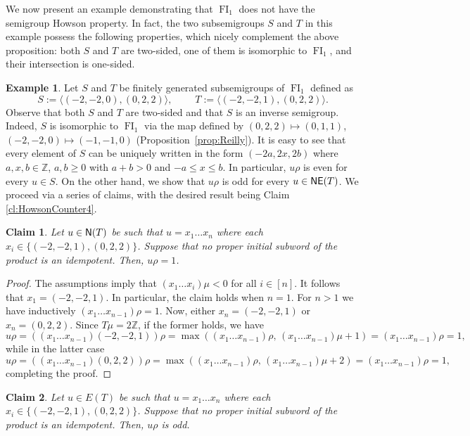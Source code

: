 \documentclass[reqno]{amsart}
\theoremstyle{plain}
\newtheorem{claim}{Claim}[lem]
\theoremstyle{definition}
\newtheorem{ex}[lem]{Example}
\DeclareMathOperator{\FI}{FI}
\DeclareMathOperator{\N}{\textup{\textsf{N}}}
\DeclareMathOperator{\NE}{\textup{\textsf{NE}}}
\numberwithin{equation}{section}
\begin{document}
We now present an example demonstrating that $\FI_1$ does not have the semigroup Howson property. 
In fact, the two subsemigroups $S$ and $T$ in this example possess the following properties, which nicely complement the above proposition: both $S$ and $T$ are two-sided, one  of them is isomorphic to $\FI_1$, and their intersection is one-sided.


\begin{ex}
\label{ex:HowsonCounter1}
Let $S$ and $T$ be finitely generated subsemigroups of $\FI_1$ defined as
\[
S := \bigl\langle (-2, -2, 0), (0, 2, 2)\bigr\rangle, \quad\quad\; T := \bigl\langle (-2, -2, 1), (0, 2, 2)\bigr\rangle.
\]
Observe that both $S$ and $T$ are two-sided and that $S$ is an inverse semigroup. Indeed, $S$ is isomorphic to $\FI_1$ via the map defined by $(0, 2, 2) \mapsto (0, 1, 1)$, $(-2, -2, 0)\mapsto (-1, -1, 0)$ (Proposition~\ref{prop:Reilly}). It is easy to see that every element of $S$ can be uniquely written in the form $(-2a, 2x, 2b)$ where $a, x, b\in\mathbb{Z}$, $a,b\geq 0$ with $a+b>0$ and $-a\leq x\leq b$. In particular, $u\rho$ is even for every $u\in S$. On the other hand, we show that $u\rho$ is odd for every $u\in\NE(T)$. We proceed via a series of claims, with the desired result being Claim \ref{cl:HowsonCounter4}.


\begin{claim}
\label{cl:HowsonCounter1}
Let $u\in \N(T)$ be such that $u = x_1\dots x_n$ where each $x_i\in\{(-2, -2, 1), (0, 2, 2)\}$. Suppose that no proper initial subword of the product is an idempotent. Then, $u\rho = 1$.
\end{claim}



\begin{proof}
The assumptions imply that $(x_1
\dots x_i)\mu<0$ for all $i\in [n]$.
It follows that $x_1 = (-2, -2, 1)$. In particular, the claim holds when $n=1$.
For $n>1$ we have inductively $(x_1\dots x_{n-1})\rho = 1$. Now, either $x_n = (-2, -2, 1)$ or $x_n = (0, 2, 2)$. Since $T\mu = 2\mathbb{Z}$, if the former holds, we have 
\[
u\rho = ((x_1\dots x_{n-1})(-2, -2, 1))\rho = \max((x_1\dots x_{n-1})\rho,\, (x_1\dots x_{n-1})\mu + 1) = (x_1\dots x_{n-1})\rho = 1,
\]
while in the latter case
\[
u\rho = ((x_1\dots x_{n-1})(0, 2, 2))\rho = \max((x_1\dots x_{n-1})\rho,\, (x_1\dots x_{n-1})\mu + 2) = (x_1\dots x_{n-1})\rho = 1,
\]
completing the  proof.
\end{proof}

\begin{claim}
\label{cl:HowsonCounter2}
Let $u\in E(T)$ be such that $u = x_1\dots x_n$ where each $x_i\in\{(-2, -2, 1), (0, 2, 2)\}$. Suppose that no proper initial subword of the product is an idempotent. Then, $u\rho$ is odd.
\end{claim}




\end{ex}
\end{document}
